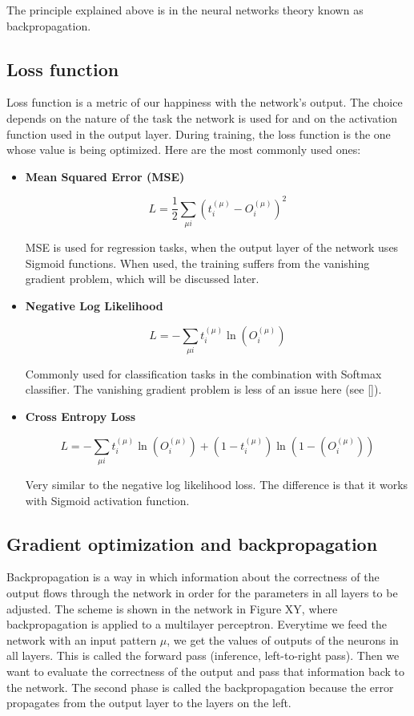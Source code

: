 The principle explained above is in the neural networks theory known as backpropagation.

\subsection{Loss function}

Loss function is a metric of our happiness with the network's output. The choice depends on the nature of the task the network is used for and on the activation function used in the output layer. During training, the loss function is the one whose value is being optimized. Here are the most commonly used ones:

\begin{itemize}
\item \textbf{Mean Squared Error (MSE)}

$$ 	
L =  \frac{1}{2} \sum\limits_{\mu i} \left( t_{i}^{(\mu)} - O_{i}^{(\mu)} \right)^2
$$

MSE is used for regression tasks, when the output layer of the network uses Sigmoid functions. When used, the training suffers from the vanishing gradient problem, which will be discussed later. 

\item \textbf{Negative Log Likelihood} 

$$ 	
L = - \sum\limits_{\mu i}  t_{i}^{(\mu)} \ln (O_{i}^{(\mu)})
$$

Commonly used for classification tasks in the combination with Softmax classifier. The vanishing gradient problem is less of an issue here (see []).

\item \textbf{Cross Entropy Loss} 

$$ 	
L = - \sum\limits_{\mu i}  t_{i}^{(\mu)} \ln (O_{i}^{(\mu)}) + (1 - t_{i}^{(\mu)}) \ln (1 - (O_{i}^{(\mu)}))
$$

Very similar to the negative log likelihood loss. The difference is that it works with Sigmoid activation function.
\end{itemize}  

\subsection{Gradient optimization and backpropagation}

Backpropagation is a way in which information about the correctness of the output flows through the network in order for the parameters in all layers to be adjusted. The scheme is shown in the network in Figure XY, where backpropagation is applied to a multilayer perceptron. Everytime we feed the network with an input pattern $ \mu $, we get the values of outputs of the neurons in all layers. This is called the forward pass (inference, left-to-right pass). Then we want to evaluate the correctness of the output and pass that information back to the network. The second phase is called the backpropagation because the error propagates from the output layer to the layers on the left.   

